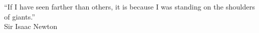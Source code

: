 \begin{dedication}
		 ``If I have seen farther than others, it is because I was standing on the shoulders of giants.''\\		
		Sir Isaac Newton
\end{dedication}

